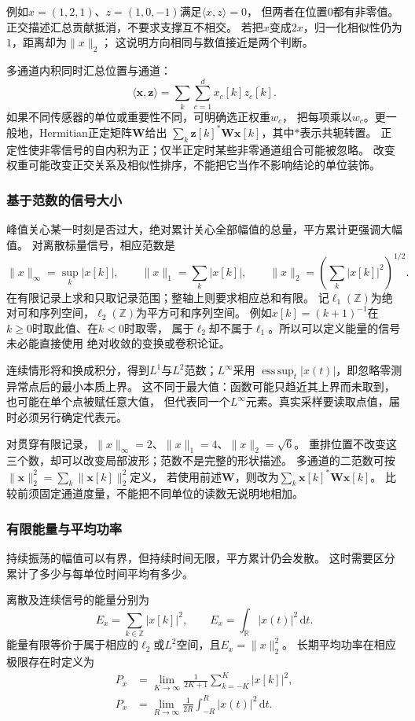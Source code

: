 例如$x=(1,2,1)$、$z=(1,0,-1)$满足$\langle x,z\rangle=0$，
但两者在位置$0$都有非零值。正交描述汇总贡献抵消，不要求支撑互不相交。
若把$x$变成$2x$，归一化相似性仍为$1$，距离却为$\|x\|_2$；
这说明方向相同与数值接近是两个判断。

多通道内积同时汇总位置与通道：
\[
  \langle\bm x,\bm z\rangle
  =\sum_k\sum_{c=1}^d x_c[k]\overline{z_c[k]}.
\]
如果不同传感器的单位或重要性不同，可明确选正权重$w_c$，
把每项乘以$w_c$。更一般地，Hermitian正定矩阵$\bm W$给出
$\sum_k\bm z[k]^*\bm W\bm x[k]$，其中$*$表示共轭转置。
正定性使非零信号的自内积为正；仅半正定时某些非零通道组合可能被忽略。
改变权重可能改变正交关系及相似性排序，不能把它当作不影响结论的单位装饰。

\subsubsection{基于范数的信号大小}

峰值关心某一时刻是否过大，绝对累计关心全部幅值的总量，平方累计更强调大幅值。
对离散标量信号，相应范数是
\[
  \|x\|_\infty=\sup_k|x[k]|,\qquad
  \|x\|_1=\sum_k|x[k]|,\qquad
  \|x\|_2=\left(\sum_k|x[k]|^2\right)^{1/2}.
\]
在有限记录上求和只取记录范围；整轴上则要求相应总和有限。
记$\ell_1(\mathbb Z)$为绝对可和序列空间，$\ell_2(\mathbb Z)$为平方可和序列空间。
例如$x[k]=(k+1)^{-1}$在$k\geq0$时取此值、在$k<0$时取零，
属于$\ell_2$却不属于$\ell_1$。所以可以定义能量的信号未必能直接使用
绝对收敛的变换或卷积论证。

连续情形将和换成积分，得到$L^1$与$L^2$范数；$L^\infty$采用
$\operatorname*{ess\,sup}_t|x(t)|$，即忽略零测异常点后的最小本质上界。
这不同于最大值：函数可能只趋近其上界而未取到，也可能在单个点被赋任意大值，
但代表同一个$L^\infty$元素。真实采样要读取点值，届时必须另行确定代表元。

对贯穿有限记录，$\|x\|_\infty=2$、$\|x\|_1=4$、$\|x\|_2=\sqrt6$。
重排位置不改变这三个数，却可以改变局部波形；范数不是完整的形状描述。
多通道的二范数可按
$\|\bm x\|_2^2=\sum_k\|\bm x[k]\|_2^2$定义，
若使用前述$\bm W$，则改为$\sum_k\bm x[k]^*\bm W\bm x[k]$。
比较前须固定通道度量，不能把不同单位的读数无说明地相加。

\subsubsection{有限能量与平均功率}

持续振荡的幅值可以有界，但持续时间无限，平方累计仍会发散。
这时需要区分累计了多少与每单位时间平均有多少。
\begin{definition}[信号能量与平均功率]
  \label{def:signal-energy-power}
  离散及连续信号的能量分别为
  \[
    E_x=\sum_{k\in\mathbb Z}|x[k]|^2,\qquad
    E_x=\int_{\mathbb R}|x(t)|^2\,\mathrm dt.
  \]
  能量有限等价于属于相应的$\ell_2$或$L^2$空间，且$E_x=\|x\|_2^2$。
  长期平均功率在相应极限存在时定义为
  \begin{align*}
    P_x&=\lim_{K\to\infty}\frac1{2K+1}\sum_{k=-K}^K|x[k]|^2,\\
    P_x&=\lim_{R\to\infty}\frac1{2R}\int_{-R}^R|x(t)|^2\,\mathrm dt.
  \end{align*}
\end{definition}

